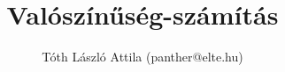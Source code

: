 \documentclass[fleqn,10pt,a4paper,titlepage]{article}
\title{Valószínűség-számítás}
\author{Tóth László Attila (panther@elte.hu)}
\date{}
\begin{document}
  \maketitle
  \mktoc
  
\end{document}
